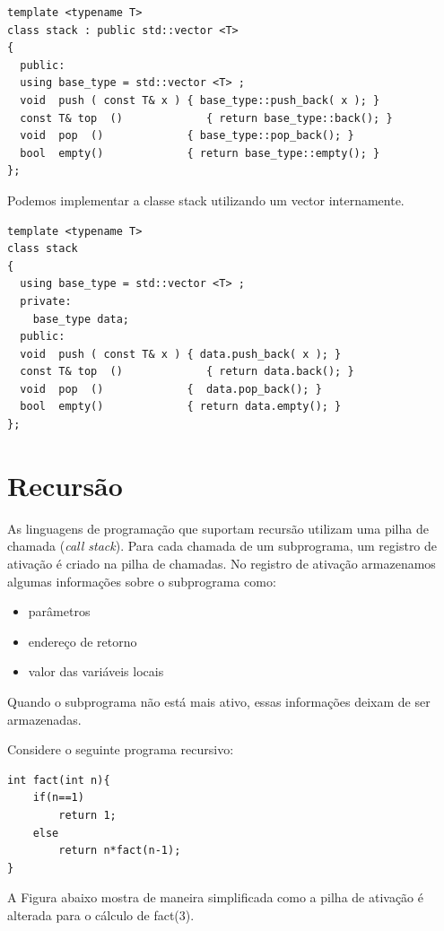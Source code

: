 \begin{verbatim}
template <typename T> 
class stack : public std::vector <T>
{
  public:
  using base_type = std::vector <T> ;
  void  push ( const T& x ) { base_type::push_back( x ); }
  const T& top  ()             { return base_type::back(); }
  void  pop  ()             { base_type::pop_back(); }
  bool  empty()             { return base_type::empty(); }
};
\end{verbatim}

Podemos implementar a classe stack utilizando um vector internamente.

\begin{verbatim}
template <typename T> 
class stack 
{
  using base_type = std::vector <T> ;
  private:
    base_type data;
  public:
  void  push ( const T& x ) { data.push_back( x ); }
  const T& top  ()             { return data.back(); }
  void  pop  ()             {  data.pop_back(); }
  bool  empty()             { return data.empty(); }
};
\end{verbatim}

\section{Recursão}

As linguagens de programação que suportam recursão utilizam uma pilha de chamada (\textit{call stack}). Para cada chamada de um subprograma, um registro de ativação é criado na pilha de chamadas. No registro de ativação armazenamos algumas informações sobre o subprograma como:

\begin{itemize}
\item parâmetros
\item endereço de retorno
\item valor das variáveis locais 
\end{itemize}

Quando o subprograma não está mais ativo, essas informações deixam de ser armazenadas. 

Considere o seguinte programa recursivo:

\begin{verbatim}
int fact(int n){
    if(n==1)
        return 1;
    else
        return n*fact(n-1);
}
\end{verbatim}

A Figura abaixo mostra de maneira simplificada como a pilha de ativação é alterada para o cálculo de fact(3). 

